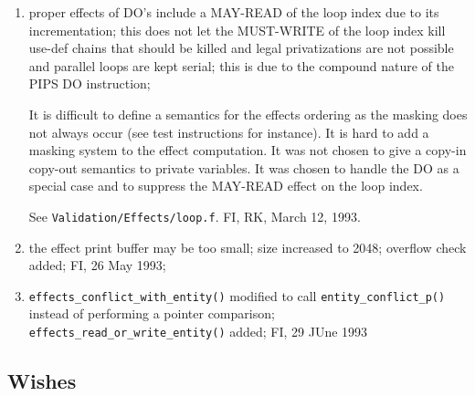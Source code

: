 \begin{enumerate}
  \item proper effects of DO's include a MAY-READ of the loop index
        due to its incrementation; this does not let the MUST-WRITE
        of the loop index kill use-def chains that should be killed
        and legal privatizations are not possible and parallel loops
        are kept serial; this is due to the compound nature of the PIPS DO
        instruction;

        It is difficult to define a semantics for the effects ordering
        as the masking does not always occur (see test instructions for
instance).
        It is hard to add a masking system to the effect computation.
        It was not chosen to give a copy-in copy-out semantics to
        private variables.
        It was chosen to handle the DO as a special case and to
        suppress the MAY-READ effect on the loop index.

        See \verb+Validation/Effects/loop.f+. FI, RK, March 12, 1993.

  \item the effect print buffer may be too small; size increased to
        2048; overflow check added; FI, 26 May 1993;

  \item \verb+effects_conflict_with_entity()+ modified to call
        \verb+entity_conflict_p()+ instead of performing a pointer
        comparison; \verb+effects_read_or_write_entity()+ added;
        FI, 29 JUne 1993
        
\end{enumerate}

\subsection{Wishes}

